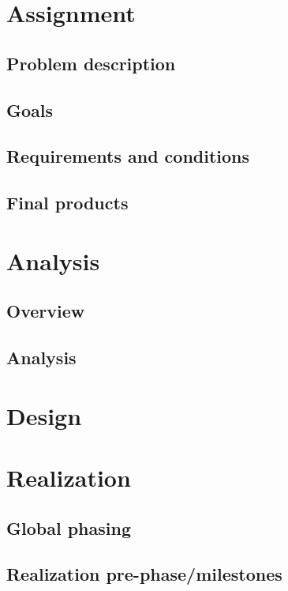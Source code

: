 \documentclass[12pt,a4paper]{report}
\begin{document}
\chapter{Assignment}

\section{Problem description}

\section{Goals}

\section{Requirements and conditions}

\section{Final products}

\chapter{Analysis}
\section{Overview}

\section{Analysis}

\chapter{Design}

\chapter{Realization}
\section{Global phasing}

\section{Realization pre-phase/milestones}
\end{document}
